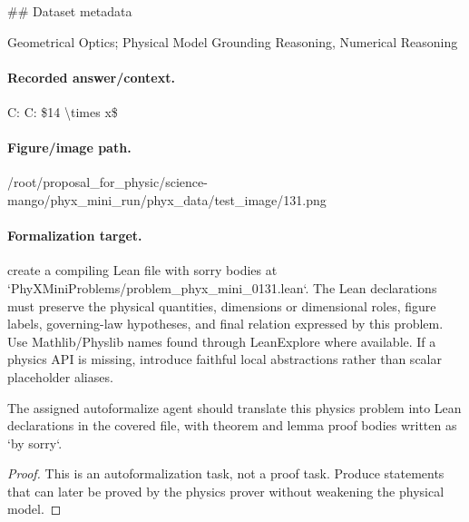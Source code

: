\#\# Dataset metadata

Geometrical Optics; Physical Model Grounding Reasoning, Numerical Reasoning

\paragraph{Recorded answer/context.}
C: C: \$14 \textbackslash{}times x\$

\paragraph{Figure/image path.}
/root/proposal\_for\_physic/science-mango/phyx\_mini\_run/phyx\_data/test\_image/131.png

\paragraph{Formalization target.}
create a compiling Lean file with sorry bodies at `PhyXMiniProblems/problem\_phyx\_mini\_0131.lean`. The Lean declarations must preserve the physical quantities, dimensions or dimensional roles, figure labels, governing-law hypotheses, and final relation expressed by this problem.
Use Mathlib/Physlib names found through LeanExplore where available. If a physics API is missing, introduce faithful local abstractions rather than scalar placeholder aliases.

\begin{theorem}
\label{thm:physics:phyx_mini_0131:target}
The assigned autoformalize agent should translate this physics problem into Lean declarations in the covered file, with theorem and lemma proof bodies written as `by sorry`.
\end{theorem}
\begin{proof}
This is an autoformalization task, not a proof task. Produce statements that can later be proved by the physics prover without weakening the physical model.
\end{proof}

